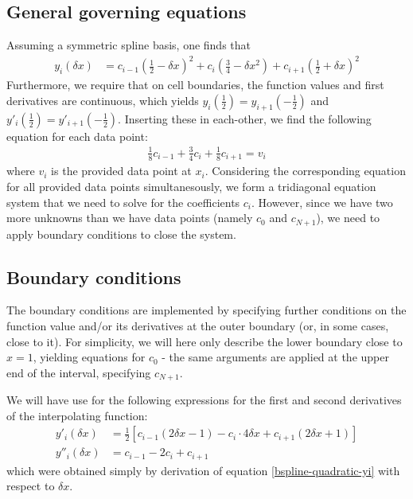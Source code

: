 \documentclass{article}
\begin{document}
\subsection{General governing equations}

Assuming a symmetric spline basis, one finds that 
\begin{align}
\label{bspline-quadratic-yi}
y_i(\delta x) &= c_{i-1}\left(\tfrac{1}{2} - \delta x\right)^{2} + c_{i}\left(\tfrac{3}{4} - \delta x^{2}\right) + c_{i+1}\left(\tfrac{1}{2} + \delta x\right)^{2}
\end{align}
Furthermore, we require that on cell boundaries, the function values and first derivatives are continuous, which yields $y_{i}(\frac{1}{2}) = y_{i+1}(-\frac{1}{2})$ and $y'_{i}(\frac{1}{2}) = y'_{i+1}(-\frac{1}{2})$. Inserting these in each-other, we find the following equation for each data point:
\begin{align*}\frac{1}{8} c_{i-1} + \frac{3}{4} c_{i} + \frac{1}{8} c_{i+1} = v_i\end{align*}
where $v_{i}$ is the provided data point at $x_{i}$. Considering the corresponding equation for all provided data points simultanesously, we form a tridiagonal equation system that we need to solve for the coefficients $c_{i}$. However, since we have two more unknowns than we have data points (namely $c_{0}$ and $c_{N+1}$), we need to apply boundary conditions to close the system.

\subsection{Boundary conditions}

The boundary conditions are implemented by specifying further conditions on the function value and/or its derivatives at the outer boundary (or, in some cases, close to it). For simplicity, we will here only describe the lower boundary close to $x = 1$, yielding equations for $c_0$ - the same arguments are applied at the upper end of the interval, specifying $c_{N+1}$.

We will have use for the following expressions for the first and second derivatives of the interpolating function:
\begin{align*}
y'_i(\delta x) &= \frac{1}{2}\left[c_{i-1}(2\delta x-1) - c_i \cdot 4\delta x + c_ {i+1} (2\delta x + 1)\right] \\
y''_i(\delta x) &= c_{i-1} - 2c_i + c_{i+1}
\end{align*}
which were obtained simply by derivation of equation \eqref{bspline-quadratic-yi} with respect to $\delta x$.
\end{document}
